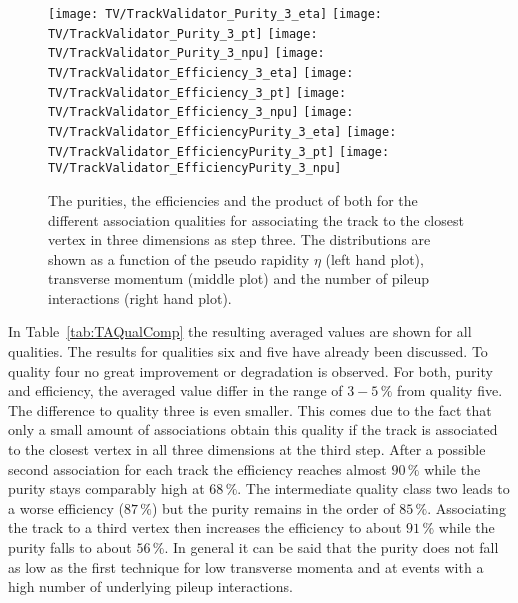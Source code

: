\begin{figure}[h!t]
  \centering
  \texttt{[image: TV/TrackValidator\_Purity\_3\_eta]}
  \texttt{[image: TV/TrackValidator\_Purity\_3\_pt]}
  \texttt{[image: TV/TrackValidator\_Purity\_3\_npu]}
  \newline
  \texttt{[image: TV/TrackValidator\_Efficiency\_3\_eta]}
  \texttt{[image: TV/TrackValidator\_Efficiency\_3\_pt]}
  \texttt{[image: TV/TrackValidator\_Efficiency\_3\_npu]}
  \newline
  \texttt{[image: TV/TrackValidator\_EfficiencyPurity\_3\_eta]}
  \texttt{[image: TV/TrackValidator\_EfficiencyPurity\_3\_pt]}
  \texttt{[image: TV/TrackValidator\_EfficiencyPurity\_3\_npu]}
  \caption[Purities, efficiencies and their product for for the different quality of the association map with associating to the closest vertex in three dimensions as third step]{The purities, the efficiencies and the product of both for the different association qualities for associating the track to the closest vertex in three dimensions as step three. The distributions are shown as a function of the pseudo rapidity $\eta$ (left hand plot), transverse momentum (middle plot) and the number of pileup interactions (right hand plot). \label{plot:TASEFRDQ3Signal}}
\end{figure}

In Table~\ref{tab:TAQualComp} the resulting averaged values are shown for all qualities. The results for qualities six and five have already been discussed. To quality four no great improvement or degradation is observed. For both, purity and efficiency, the averaged value differ in the range of $3-5\,\%$ from quality five. The difference to quality three is even smaller. This comes due to the fact that only a small amount of associations obtain this quality if the track is associated to the closest vertex in all three dimensions at the third step. After a possible second association for each track the efficiency reaches almost $90\,\%$ while the purity stays comparably high at $68\,\%$. The intermediate quality class two leads to a worse efficiency ($87\,\%$) but the purity remains in the order of $85\,\%$. Associating the track to a third vertex then increases the efficiency to about $91\,\%$ while the purity falls to about $56\,\%$. In general it can be said that the purity does not fall as low as the first technique for low transverse momenta and at events with a high number of underlying pileup interactions. \\ \\

